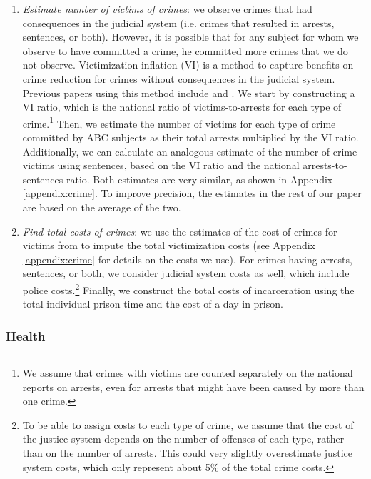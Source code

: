 \begin{enumerate}
\item \textit{Estimate number of victims of crimes}: we observe crimes that had consequences in the judicial system (i.e. crimes that resulted in arrests, sentences, or both). However, it is possible that for any subject for whom we observe to have committed a crime, he committed more crimes that we do not observe. Victimization inflation (VI) is a method to capture benefits on crime reduction for crimes without consequences in the judicial system. Previous papers using this method include \citet{Belfield_Nores_etal_2006_JHR} and \cite{Heckman_Moon_etal_2010_RateofReturn}. We start by constructing a VI ratio, which is the national ratio of victims-to-arrests for each type of crime.\footnote{We assume that crimes with victims are counted separately on the national reports on arrests, even for arrests that might have been caused by more than one crime.} Then, we estimate the number of victims for each type of crime committed by ABC subjects as their total arrests multiplied by the VI ratio. Additionally, we can calculate an analogous estimate of the number of crime victims using sentences, based on the VI ratio and the national arrests-to-sentences ratio. Both estimates are very similar, as shown in Appendix \ref{appendix:crime}. To improve precision, the estimates in the rest of our paper are based on the average of the two.

\item \textit{Find total costs of crimes}: we use the estimates of the cost of crimes for victims from \cite{McCollister_etal_2010_DAD} to impute the total victimization costs (see Appendix \ref{appendix:crime} for details on the costs we use). For crimes having arrests, sentences, or both, we consider judicial system costs as well, which include  police costs.\footnote{To be able to assign costs to each type of crime, we assume that the cost of the justice system depends on the number of offenses of each type, rather than on the number of arrests. This could very slightly overestimate justice system costs, which only represent about 5\% of the total crime costs.} Finally, we construct the total costs of incarceration using the total individual prison time and the cost of a day in prison.
\end{enumerate}

\subsubsection{Health} \label{section:health}

